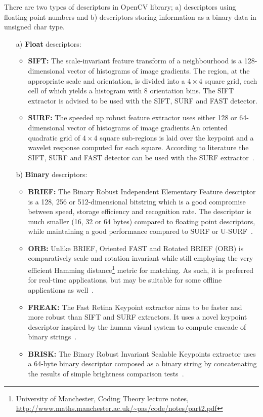 There are two types of descriptors in OpenCV library; a) descriptors using floating point numbers and b) descriptors storing information as a binary data in unsigned char type.
\begin{itemize}
	\item[a)] \textbf{Float} descriptors:
	
	\begin{itemize}
		\item \textbf{SIFT:} The scale-invariant feature transform of a neighbourhood is a 128-dimensional vector of histograms of image gradients. The region, at the appropriate scale and orientation, is divided into a $4\times 4$ square grid, each cell of which yields a histogram with 8 orientation bins. The SIFT extractor is advised to be used with the SIFT, SURF and FAST detector.
		\item \textbf{SURF:} The speeded up robust feature extractor uses either 128 or 64-dimensional vector of histograms of image gradients.An oriented quadratic grid of $4 \times 4$ square sub-regions is laid over the keypoint and a wavelet response computed for each square. According to literature the SIFT, SURF and FAST detector can be used with the SURF extractor~\cite{surf}.
	\end{itemize}
	
	\item[b)] \textbf{Binary} descriptors:
	
	\begin{itemize}
		\item \textbf{BRIEF:} The Binary Robust Independent Elementary Feature descriptor is a 128, 256 or 512-dimensional bitstring which is a good compromise between speed, storage efficiency and recognition rate. The descriptor is much smaller (16, 32 or 64 bytes) compared to floating point descriptors, while maintaining a good performance compared to SURF or U-SURF~\cite{article:brief}.
		
		\item \textbf{ORB:} Unlike BRIEF, Oriented FAST and Rotated BRIEF (ORB) is comparatively scale and rotation invariant while still employing the very efficient Hamming distance\footnote{University of Manchester, Coding Theory lecture notes, \url{http://www.maths.manchester.ac.uk/~pas/code/notes/part2.pdf}} metric for matching. As such, it is preferred for real-time applications, but may be suitable for some offline applications as well~\cite{article:orb}.
		
		\item \textbf{FREAK:} The Fast Retina Keypoint extractor aims to be faster and more robust than SIFT and SURF extractors. It uses a novel keypoint descriptor inspired by the human visual system to compute cascade of binary strings~\cite{article:freak}.
		
		\item \textbf{BRISK:}  The  Binary Robust Invariant Scalable Keypoints extractor uses a 64-byte binary descriptor composed as a binary string by concatenating the results of simple brightness comparison tests~\cite{article:brisk}.
	\end{itemize}
\end{itemize}

